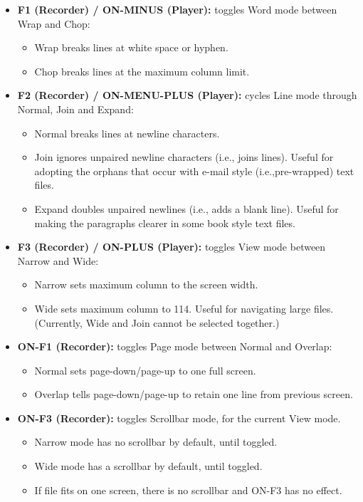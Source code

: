 \begin{itemize}
\item \textbf{F1 (Recorder) / ON{}-MINUS (Player): }
toggles Word mode between Wrap and Chop:

\begin{itemize}
\item Wrap breaks lines at white space or hyphen.
\item Chop breaks lines at the maximum column limit.
\end{itemize}

\item \textbf{F2 (Recorder) / ON{}-MENU{}-PLUS (Player): }
cycles Line mode through Normal, Join and Expand:

\begin{itemize}
\item Normal breaks lines at newline characters.
\item Join ignores unpaired newline characters  (i.e., joins lines). Useful for
adopting the orphans that occur with e{}-mail style (i.e.,pre{}-wrapped) text files.
\item Expand doubles unpaired newlines (i.e., adds a blank line). Useful
for making the paragraphs clearer in some book style text files.
\end{itemize}

\item \textbf{F3 (Recorder) / ON{}-PLUS (Player):} 
toggles View mode between Narrow and Wide:

\begin{itemize}
\item Narrow sets maximum column to the screen width.
\item Wide sets maximum column to 114. Useful for navigating large
files. (Currently, Wide and Join cannot be selected together.)
\end{itemize}

\item \textbf{ON{}-F1 (Recorder):} 
toggles Page mode between Normal and Overlap:

\begin{itemize}
\item Normal sets page{}-down/page{}-up to one full screen.
\item Overlap tells page{}-down/page{}-up to retain one line from
previous screen.
\end{itemize}

\item \textbf{ON{}-F3 (Recorder):} 
toggles Scrollbar mode, for the current View mode.

\begin{itemize}
\item Narrow mode has no scrollbar by default, until toggled.
\item Wide mode has a scrollbar by default, until toggled.
\item If file fits on one screen, there is no scrollbar and ON{}-F3 has
no effect.
\end{itemize}
\end{itemize}

